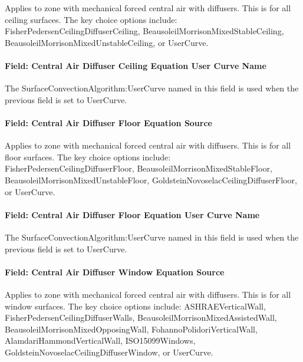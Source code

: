 Applies to zone with mechanical forced central air with diffusers. This is for all ceiling surfaces. The key choice options include: FisherPedersenCeilingDiffuserCeiling, BeausoleilMorrisonMixedStableCeiling, BeausoleilMorrisonMixedUnstableCeiling, or UserCurve.

\paragraph{Field: Central Air Diffuser Ceiling Equation User Curve Name}\label{field-central-air-diffuser-ceiling-equation-user-curve-name}

The SurfaceConvectionAlgorithm:UserCurve named in this field is used when the previous field is set to UserCurve.

\paragraph{Field: Central Air Diffuser Floor Equation Source}\label{field-central-air-diffuser-floor-equation-source}

Applies to zone with mechanical forced central air with diffusers. This is for all floor surfaces. The key choice options include: FisherPedersenCeilingDiffuserFloor, BeausoleilMorrisonMixedStableFloor, BeausoleilMorrisonMixedUnstableFloor, GoldsteinNovoselacCeilingDiffuserFloor, or UserCurve.

\paragraph{Field: Central Air Diffuser Floor Equation User Curve Name}\label{field-central-air-diffuser-floor-equation-user-curve-name}

The SurfaceConvectionAlgorithm:UserCurve named in this field is used when the previous field is set to UserCurve.

\paragraph{Field: Central Air Diffuser Window Equation Source}\label{field-central-air-diffuser-window-equation-source}

Applies to zone with mechanical forced central air with diffusers. This is for all window surfaces. The key choice options include: ASHRAEVerticalWall, FisherPedersenCeilingDiffuserWalls, BeausoleilMorrisonMixedAssistedWall, BeausoleilMorrisonMixedOpposingWall, FohannoPolidoriVerticalWall, AlamdariHammondVerticalWall, ISO15099Windows, GoldsteinNovoselacCeilingDiffuserWindow, or UserCurve.


